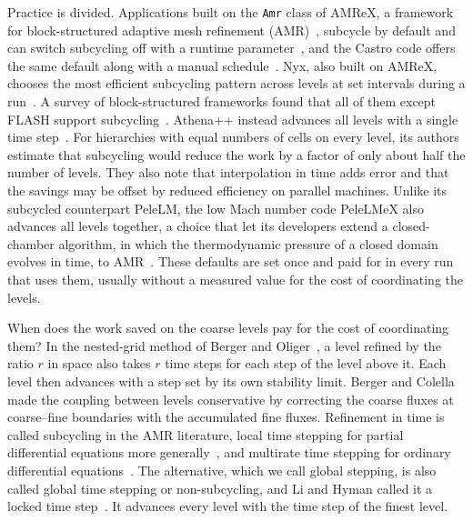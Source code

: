 \documentclass[12pt]{article}
\theoremstyle{remark}
\begin{document}
Practice is divided. Applications built on the \texttt{Amr} class of AMReX, a framework for block-structured adaptive mesh refinement (AMR)~\cite{zhang2019amrex}, subcycle by default and can switch subcycling off with a runtime parameter~\cite{amrex2026runtime}, and the Castro code offers the same default along with a manual schedule~\cite{castro2026timestepping}. Nyx, also built on AMReX, chooses the most efficient subcycling pattern across levels at set intervals during a run~\cite{almgren2013nyx,amrex2026source}. A survey of block-structured frameworks found that all of them except FLASH support subcycling~\cite{dubey2014survey}. Athena++ instead advances all levels with a single time step~\cite{stone2020athena}. For hierarchies with equal numbers of cells on every level, its authors estimate that subcycling would reduce the work by a factor of only about half the number of levels. They also note that interpolation in time adds error and that the savings may be offset by reduced efficiency on parallel machines. Unlike its subcycled counterpart PeleLM, the low Mach number code PeleLMeX also advances all levels together, a choice that let its developers extend a closed-chamber algorithm, in which the thermodynamic pressure of a closed domain evolves in time, to AMR~\cite{esclapez2023pelelmex}. These defaults are set once and paid for in every run that uses them, usually without a measured value for the cost of coordinating the levels.

When does the work saved on the coarse levels pay for the cost of coordinating them? In the nested-grid method of Berger and Oliger~\cite{berger1984adaptive}, a level refined by the ratio $r$ in space also takes $r$ time steps for each step of the level above it. Each level then advances with a step set by its own stability limit. Berger and Colella~\cite{berger1989local} made the coupling between levels conservative by correcting the coarse fluxes at coarse--fine boundaries with the accumulated fine fluxes. Refinement in time is called subcycling in the AMR literature, local time stepping for partial differential equations more generally~\cite{osher1983numerical,dumbser2014arbitrary}, and multirate time stepping for ordinary differential equations~\cite{savcenco2007multirate}. The alternative, which we call global stepping, is also called global time stepping or non-subcycling, and Li and Hyman called it a locked time step~\cite{li2003adaptive,li2006local}. It advances every level with the time step of the finest level.
\end{document}
